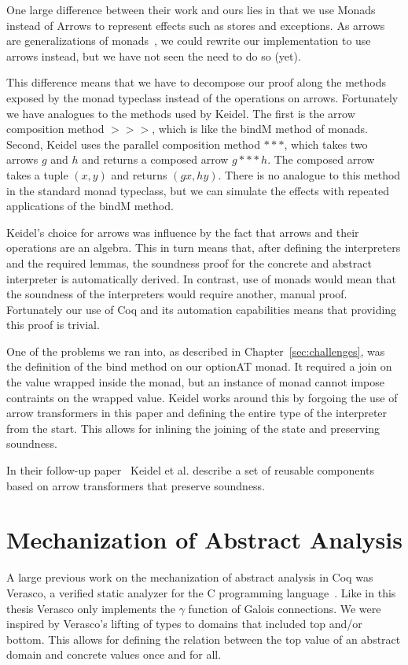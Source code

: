 One large difference between their work and ours
lies in that we use Monads instead of Arrows to represent 
effects such as stores and exceptions. As
arrows are generalizations of monads~\cite{hughes2000generalising}, we could
rewrite our implementation to use arrows instead, but we have not seen the need
to do so (yet). 

This difference means that we have to decompose our proof along the methods
exposed by the monad typeclass instead of the operations on arrows. Fortunately
we have analogues to the methods used by Keidel. The first is the arrow
composition method $>>>$, which is like the bindM method of monads.  Second,
Keidel uses the parallel composition method $***$, which takes two arrows $g$
and $h$ and
returns a composed arrow $g *** h$. The composed arrow takes a tuple $(x,y)$
and returns $(g x, h y)$. There is no analogue to this method in the standard
monad typeclass, but we can simulate the effects with repeated applications of
the bindM method.

Keidel's choice for arrows was influence by the fact that arrows and their
operations are an algebra. This in turn means that, after defining the
interpreters and the required lemmas, the soundness proof for the concrete and
abstract interpreter is automatically derived. In contrast, use of monads would
mean that the soundness of the interpreters would require another, manual
proof. Fortunately our use of Coq and its automation capabilities means that
providing this proof is trivial.

One of the problems we ran into, as described in Chapter~\ref{sec:challenges},
was the definition of the bind method on our optionAT monad. It required a join
on the value wrapped inside the monad, but an instance of monad cannot impose
contraints on the wrapped value. Keidel works around this by forgoing the use
of arrow transformers in this paper and defining the entire type of the
interpreter from the start. This allows for inlining the joining of the state
and preserving soundness.

In their follow-up paper~\cite{keidel2019sound} Keidel et al. describe a set of
reusable components based on arrow transformers that preserve soundness.

\section{Mechanization of Abstract Analysis}
A large previous work on the mechanization of abstract analysis in Coq was
Verasco, a verified static analyzer for the C programming
language~\cite{jourdan2016verasco}. Like in
this thesis Verasco only implements the $\gamma$ function of Galois
connections. We were inspired by Verasco's lifting of types to domains that
included top and/or bottom. This allows for defining the relation between the
top value of an abstract domain and concrete values once and for all. 

